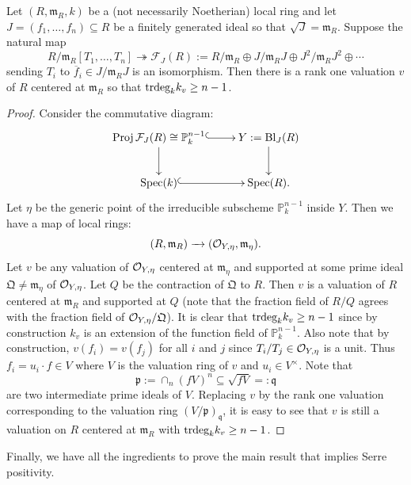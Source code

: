 \documentclass[12pt]{amsart}
\numberwithin{equation}{theorem}
\numberwithin{equation}{theorem}
\renewcommand{\m}{\mathfrak{m}}
\newcommand{\Bl}{\textnormal{Bl}}
\newcommand{\trdeg}{\textnormal{trdeg}}
\begin{document}
\begin{lemma}
\label{lem: analytic spread n}
Let $(R,\m_R, k)$ be a (not necessarily Noetherian) local ring and let $J=(f_1,\dots,f_n)\subseteq R$ be a finitely generated ideal so that $\sqrt{J}=\m_R$. Suppose the natural map 
$$R/\m_R[T_1,\dots,T_n] \twoheadrightarrow \mathcal{F}_J(R):= R/\m_R \oplus J/\m_RJ \oplus J^2/\m_RJ^2 \oplus \cdots $$
sending $T_i$ to $\overline{f}_i\in J/\m_R J$ is an isomorphism. Then there is a rank one valuation $v$ of $R$ centered at $\m_R$ so that 
$\trdeg_kk_v\geq n-1$.
\end{lemma}
\begin{proof}
Consider the commutative diagram: 
\[\xymatrix{
\Proj \mathcal{F}_J(R) \cong \mathbb{P}_{k}^{n-1} \ar@{^{(}->}[r] \ar[d] & Y := \Bl_J(R) \ar[d] \\
\Spec(k) \ar@{^{(}->}[r] &  \Spec(R).
}\]
Let $\eta$ be the generic point of the irreducible subscheme $\mathbb{P}_{k}^{n-1}$ inside $Y$. Then we have a map of local rings:
$$(R,\m_R) \to (\sO_{Y,\eta},\m_{\eta}).$$
Let $v$ be any valuation of $\mathcal O_{Y,\eta}$ centered at $\m_{\eta}$ and supported at some prime ideal $\mathfrak{Q}\neq \m_\eta$ of $\mathcal O_{Y,\eta}$. Let $Q$ be the contraction of $\mathfrak{Q}$ to $R$. Then $v$ is a valuation of $R$ centered at $\m_R$ and supported at $Q$ (note that the fraction field of $R/Q$ agrees with the fraction field of $\mathcal O_{Y,\eta}/\mathfrak{Q}$). It is clear that $\trdeg_kk_v\geq n-1$ since by construction $k_v$ is an extension of the function field of $\mathbb{P}_k^{n-1}$. Also note that by construction, $v(f_i)=v(f_j)$ for all $i$ and $j$ since $T_i/T_j\in \mathcal O_{Y,\eta}$ is a unit. Thus $f_i=u_i\cdot f \in V$ where $V$ is the valuation ring of $v$ and $u_i\in V^\times$. Note that 
$$\mathfrak{p}:= \cap_n(fV)^n\subseteq \sqrt{fV}=: \mathfrak{q}$$
are two intermediate prime ideals of $V$. Replacing $v$ by the rank one valuation corresponding to the valuation ring $(V/\mathfrak{p})_\mathfrak{q}$, it is easy to see that $v$ is still a valuation on $R$ centered at $\m_R$ with $\trdeg_kk_v\geq n-1$. 
\end{proof}

Finally, we have all the ingredients to prove the main result that implies Serre positivity.
\end{document}
